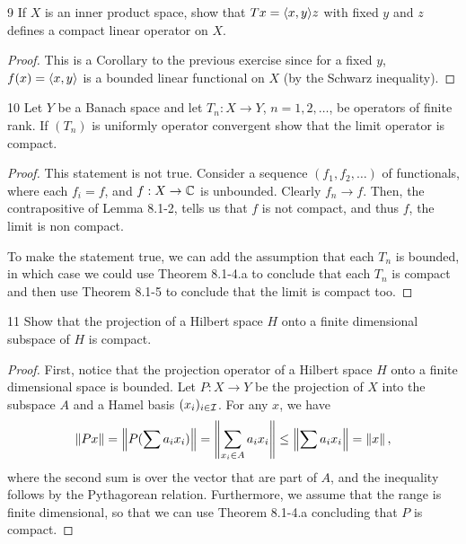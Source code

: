 \begin{exercise}{9}
If $X$ is an inner product space, show that $Tx = \langle x, y\rangle z$ with fixed $y$ and $z$ defines a compact linear operator on $X$.
\end{exercise}
\begin{proof}
This is a Corollary to the previous exercise since for a fixed $y$, $f(x) = \langle x, y\rangle$ is a bounded linear functional on $X$ (by the Schwarz inequality).
\end{proof} 

\begin{exercise}{10}
Let $Y$ be a Banach space and let $T_n: X \to Y$, $n = 1, 2, \dots$, be operators of finite rank.
If $(T_n)$ is uniformly operator convergent show that the limit operator is compact.
\end{exercise}
\begin{proof}
This statement is not true.
Consider a sequence $(f_1, f_2, \dots)$ of functionals, where each $f_i = f$, and $f: X \to \mathbb{C}$ is unbounded.
Clearly $f_n \to f$.
Then, the contrapositive of Lemma 8.1-2, tells us that $f$ is not compact, and thus $f$, the limit is non compact.

To make the statement true, we can add the assumption that each $T_n$ is bounded, in which case we could use Theorem 8.1-4.a to conclude that each $T_n$ is compact and then use Theorem 8.1-5 to conclude that the limit is compact too.
\end{proof} 

\begin{exercise}{11}
Show that the projection of a Hilbert space $H$ onto a finite dimensional subspace of $H$ is compact.
\end{exercise}
\begin{proof}
First, notice that the projection operator of a Hilbert space $H$ onto a finite dimensional space is bounded.
Let $P: X \to Y$ be the projection of $X$ into the subspace $A$ and a Hamel basis $(x_i)_{i \in \mathcal{I}}$.
For any $x$, we have 
\begin{align*}
    \left\lVert Px\right\rVert 
    = \left\lVert P(\sum a_i x_i)\right\rVert 
    = \left\lVert \sum_{x_i \in A} a_i x_i\right\rVert 
    \leq \left\lVert \sum a_i x_i\right\rVert
    = \left\lVert x\right\rVert,
\end{align*}
where the second sum is over the vector that are part of $A$, and the inequality follows by the Pythagorean relation.
Furthermore, we assume that the range is finite dimensional, so that we can use Theorem 8.1-4.a concluding that $P$ is compact.
\end{proof} 

